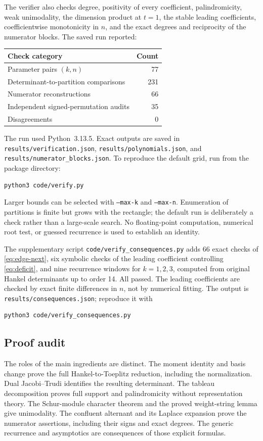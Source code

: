 \documentclass[11pt,a4paper]{article}
\theoremstyle{definition}
\theoremstyle{remark}
\numberwithin{equation}{section}
\begin{document}
The verifier also checks degree, positivity of every coefficient,
palindromicity, weak unimodality, the dimension product at \(t=1\), the
stable leading coefficients, coefficientwise monotonicity in \(n\), and
the exact degrees and reciprocity of the numerator blocks. The saved run
reported:
\begin{center}
\begin{tabular}{@{}lr@{}}
\toprule
Check category & Count\\
\midrule
Parameter pairs \((k,n)\) &77\\
Determinant-to-partition comparisons &231\\
Numerator reconstructions &66\\
Independent signed-permutation audits &35\\
Disagreements &0\\
\bottomrule
\end{tabular}
\end{center}
The run used Python~3.13.5. Exact outputs are saved in
\texttt{results/verification.json}, \texttt{results/polynomials.json}, and
\texttt{results/numerator\_blocks.json}. To reproduce the default grid,
run from the package directory:
\begin{verbatim}
python3 code/verify.py
\end{verbatim}
Larger bounds can be selected with \texttt{--max-k} and
\texttt{--max-n}. Enumeration of partitions is finite but grows with the
rectangle; the default run is deliberately a check rather than a large-scale
search. No floating-point computation, numerical root test, or guessed
recurrence is used to establish an identity.

The supplementary script \texttt{code/verify\_consequences.py} adds
66 exact checks of \eqref{eq:edge-next}, six symbolic checks of the
leading coefficient controlling \eqref{eq:deficit}, and nine recurrence
windows for \(k=1,2,3\), computed from original Hankel determinants up
to order 14. All passed. The leading coefficients are checked by exact
finite differences in \(n\), not by numerical fitting. The output is
\texttt{results/consequences.json}; reproduce it with
\begin{verbatim}
python3 code/verify_consequences.py
\end{verbatim}

\subsection{Proof audit}
The roles of the main ingredients are distinct. The moment identity and
basis change prove the full Hankel-to-Toeplitz reduction, including the
normalization. Dual Jacobi--Trudi identifies the resulting determinant.
The tableau decomposition proves full support and palindromicity without
representation theory. The Schur-module character theorem and the proved
weight-string lemma give unimodality. The confluent alternant and its
Laplace expansion prove the numerator assertions, including their signs
and exact degrees. The generic recurrence and asymptotics are consequences
of those explicit formulas.
\end{document}
